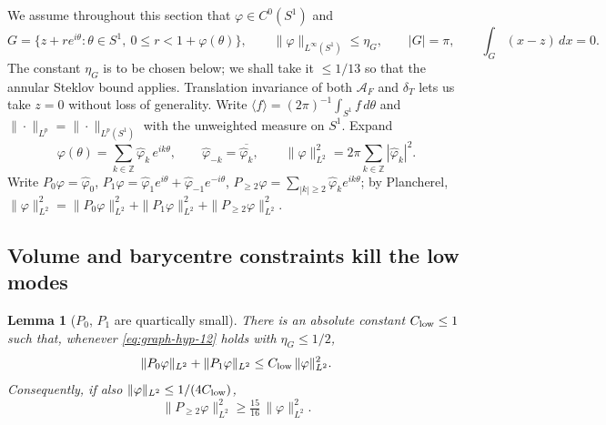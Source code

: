 \documentclass[11pt]{amsart}
\newtheorem{lemma}[theorem]{Lemma}
\newcommand{\dT}{\delta_T}
\newcommand{\AF}{\mathcal A_F}
\begin{document}
We assume throughout this section that
\(\varphi\in C^0(S^1)\) and
\begin{equation}\label{eq:graph-hyp-12}
   G=\{z+r e^{i\theta}:\theta\in S^1,\ 0\le r<1+\varphi(\theta)\},
   \qquad
   \|\varphi\|_{L^\infty(S^1)}\le\eta_G,
   \qquad
   |G|=\pi,
   \qquad
   \int_G(x-z)\,dx=0.
\end{equation}
The constant \(\eta_G\) is to be chosen below; we shall take it
\(\le 1/13\) so that the annular Steklov bound applies.  Translation
invariance of both \(\AF\) and \(\dT\) lets us take \(z=0\) without
loss of generality.  Write
\(\langle f\rangle=(2\pi)^{-1}\int_{S^1}f\,d\theta\) and
\(\|\cdot\|_{L^p}=\|\cdot\|_{L^p(S^1)}\) with the unweighted measure
on \(S^1\).  Expand
\begin{equation}\label{eq:fourier-12}
   \varphi(\theta)=\sum_{k\in\mathbb Z}\hat\varphi_k\,e^{ik\theta},
   \qquad
   \hat\varphi_{-k}=\overline{\hat\varphi_k},
   \qquad
   \|\varphi\|_{L^2}^2=2\pi\sum_{k\in\mathbb Z}|\hat\varphi_k|^2 .
\end{equation}
Write
\(P_0\varphi=\hat\varphi_0\),
\(P_1\varphi=\hat\varphi_{1}e^{i\theta}+\hat\varphi_{-1}e^{-i\theta}\),
\(P_{\ge 2}\varphi=\sum_{|k|\ge 2}\hat\varphi_k e^{ik\theta}\); by
Plancherel,
\(\|\varphi\|_{L^2}^2
   =\|P_0\varphi\|_{L^2}^2+\|P_1\varphi\|_{L^2}^2+\|P_{\ge 2}\varphi\|_{L^2}^2\).

\subsection{Volume and barycentre constraints kill the low modes}
\label{ss:G12-modes}

\begin{lemma}[\(P_0\), \(P_1\) are quartically small]
\label{lem:G12-modes}
There is an absolute constant \(C_{\rm low}\le 1\) such that,
whenever \eqref{eq:graph-hyp-12} holds with \(\eta_G\le 1/2\),
\begin{equation}\label{eq:G12-P0-P1}
   \|P_0\varphi\|_{L^2}+\|P_1\varphi\|_{L^2}
      \le C_{\rm low}\,\|\varphi\|_{L^2}^2 .
\end{equation}
Consequently, if also \(\|\varphi\|_{L^2}\le 1/(4 C_{\rm low})\),
\begin{equation}\label{eq:G12-Pge2}
   \|P_{\ge 2}\varphi\|_{L^2}^2
     \ge\tfrac{15}{16}\,\|\varphi\|_{L^2}^2 .
\end{equation}
\end{lemma}
\end{document}
